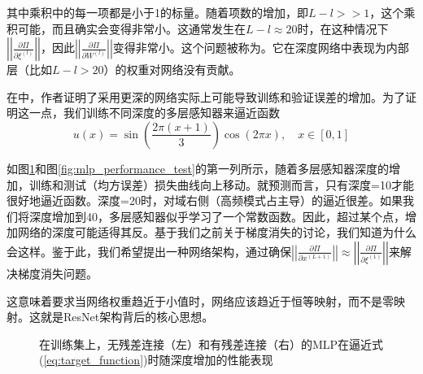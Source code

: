 其中乘积中的每一项都是小于1的标量。随着项数的增加，即$L - l >> 1$，这个乘积可能，而且确实会变得非常小。这通常发生在$L - l \approx 20$时，在这种情况下$\left|\left|\frac{\partial\Pi}{\partial\xi^{(l)}}\right|\right|$，因此$\left|\left|\frac{\partial\Pi}{\partial W^{(l)}}\right|\right|$变得非常小。这个问题被称为。它在深度网络中表现为内部层（比如$L - l > 20$）的权重对网络没有贡献。

在\cite{he2015}中，作者证明了采用更深的网络实际上可能导致训练和验证误差的增加。为了证明这一点，我们训练不同深度的多层感知器来逼近函数
\begin{equation}
u(x) = \sin\left(\frac{2\pi(x + 1)}{3}\right) \cos(2\pi x), \quad x \in [0, 1]
\label{eq:target_function}
\end{equation}

如图\ref{fig:mlp_performance_train}和图\ref{fig:mlp_performance_test}的第一列所示，随着多层感知器深度的增加，训练和测试（均方误差）损失曲线向上移动。就预测而言，只有深度=10才能很好地逼近函数。深度=20时，对域右侧（高频模式占主导）的逼近很差。如果我们将深度增加到40，多层感知器似乎学习了一个常数函数。因此，超过某个点，增加网络的深度可能适得其反。基于我们之前关于梯度消失的讨论，我们知道为什么会这样。鉴于此，我们希望提出一种网络架构，通过确保$\left|\left|\frac{\partial\Pi}{\partial x^{(L+1)}}\right|\right| \approx \left|\left|\frac{\partial\Pi}{\partial\xi^{(1)}}\right|\right|$来解决梯度消失问题。

这意味着要求当网络权重趋近于小值时，网络应该趋近于恒等映射，而不是零映射。这就是ResNet架构背后的核心思想。

\begin{figure}[H]
\centering
{}
\caption{在训练集上，无残差连接（左）和有残差连接（右）的MLP在逼近式(\ref{eq:target_function})时随深度增加的性能表现}
\label{fig:mlp_performance_train}
\end{figure}

